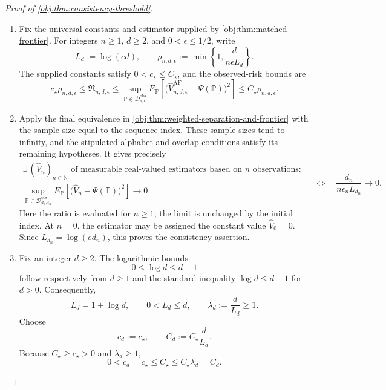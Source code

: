 \begin{proof}[Proof of \cref{obj:thm:consistency-threshold}]
\begin{enumerate}
\item Fix the universal constants and estimator supplied by
\cref{obj:thm:matched-frontier}. For integers \(n\ge1\), \(d\ge2\), and
\(0<\epsilon\le1/2\), write
\[
L_d:=\log(ed),
\qquad
\rho_{n,d,\epsilon}
:=\min\left\{1,\frac{d}{n\epsilon L_d}\right\}.
\]
The supplied constants satisfy \(0<c_\star\le C_\star\), and the observed-risk bounds are
\[
c_\star\rho_{n,d,\epsilon}
\le \mathfrak R_{n,d,\epsilon}
\le
\sup_{\mathbb P\in\mathcal D_{d,\epsilon}^{\mathrm{obs}}}
E_{\mathbb P}\!\left[
\bigl(\widehat V_{n,d,\epsilon}^{\mathrm{AF}}-\Psi(\mathbb P)\bigr)^2
\right]
\le C_\star\rho_{n,d,\epsilon}.
\]

\item Apply the final equivalence in
\cref{obj:thm:weighted-separation-and-frontier} with the sample size equal to the sequence index. These sample sizes tend to infinity, and the stipulated alphabet and overlap conditions satisfy its remaining hypotheses. It gives precisely
\[
\begin{gathered}
\exists\,(\widehat V_n)_{n\in\mathbb N}
\text{ of measurable real-valued estimators based on \(n\) observations}:\\
\sup_{\mathbb P\in\mathcal D_{d_n,\epsilon_n}^{\mathrm{obs}}}
E_{\mathbb P}\!\left[
\bigl(\widehat V_n-\Psi(\mathbb P)\bigr)^2
\right]\longrightarrow0
\end{gathered}
\quad\Longleftrightarrow\quad
\frac{d_n}{n\epsilon_n L_{d_n}}\longrightarrow0.
\]
Here the ratio is evaluated for \(n\ge1\); the limit is unchanged by the initial index. At \(n=0\), the estimator may be assigned the constant value
\(\widehat V_0=0\). Since \(L_{d_n}=\log(ed_n)\), this proves the consistency assertion.

\item Fix an integer \(d\ge2\). The logarithmic bounds
\[
0\le\log d\le d-1
\]
follow respectively from \(d\ge1\) and the standard inequality
\(\log d\le d-1\) for \(d>0\). Consequently,
\[
L_d=1+\log d,
\qquad
0<L_d\le d,
\qquad
\lambda_d:=\frac{d}{L_d}\ge1.
\]
Choose
\[
c_d:=c_\star,
\qquad
C_d:=C_\star\frac{d}{L_d}.
\]
Because \(C_\star\ge c_\star>0\) and \(\lambda_d\ge1\),
\[
0<c_d=c_\star\le C_\star
\le C_\star\lambda_d=C_d.
\]


\end{enumerate}
\end{proof}
